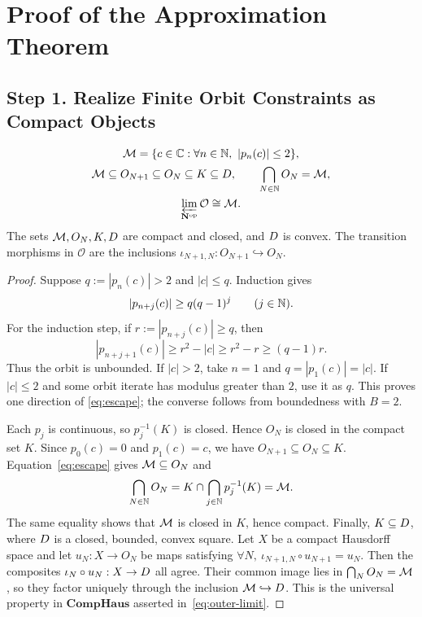 \section{Proof of the Approximation Theorem}
\label{sec:approximation-proof}

\subsection{Step 1. Realize Finite Orbit Constraints as Compact Objects}

\begin{lemma}
\label{lem:outer-sets}
\begin{gather}
 \mathcal M=\{c\in\mathbb C:\forall n\in\mathbb N,\ |p_n(c)|\le2\},\label{eq:escape}\\
 \mathcal M\subseteq O_{N+1}\subseteq O_N\subseteq K\subseteq D,\qquad
 \bigcap_{N\in\mathbb N}O_N=\mathcal M,\label{eq:outer-nesting}\\
 \varprojlim_{\mathbf N^{\mathrm{op}}}\mathcal O
       \cong\mathcal M.\label{eq:outer-limit}
\end{gather}
The sets \(\mathcal M,O_N,K,D\) are compact and closed, and \(D\) is convex.
The transition morphisms in \(\mathcal O\) are the inclusions
\(\iota_{N+1,N}:O_{N+1}\hookrightarrow O_N\).
\end{lemma}
\begin{proof}
Suppose \(q:=|p_n(c)|>2\) and \(|c|\le q\). Induction gives
\[
 |p_{n+j}(c)|\ge q(q-1)^j\qquad(j\in\mathbb N).
\]
For the induction step, if \(r:=|p_{n+j}(c)|\ge q\), then
\[
 |p_{n+j+1}(c)|
 \ge r^2-|c|
 \ge r^2-r
 \ge(q-1)r.
\]
Thus the orbit is unbounded. If \(|c|>2\), take \(n=1\) and
\(q=|p_1(c)|=|c|\). If \(|c|\le2\) and some orbit iterate has modulus
greater than \(2\), use it as \(q\). This proves one direction of
\eqref{eq:escape}; the converse follows from boundedness with \(B=2\).

Each \(p_j\) is continuous, so \(p_j^{-1}(K)\) is closed. Hence \(O_N\)
is closed in the compact set \(K\). Since \(p_0(c)=0\) and \(p_1(c)=c\),
we have \(O_{N+1}\subseteq O_N\subseteq K\). Equation~\eqref{eq:escape}
gives \(\mathcal M\subseteq O_N\) and
\[
 \bigcap_{N\in\mathbb N}O_N
 =K\cap\bigcap_{j\in\mathbb N}p_j^{-1}(K)=\mathcal M.
\]
The same equality shows that \(\mathcal M\) is closed in \(K\), hence compact.
Finally, \(K\subseteq D\), where \(D\) is a closed, bounded, convex
square. Let \(X\) be a compact Hausdorff space and let
\(u_N:X\to O_N\) be maps satisfying
\(\forall N,\ \iota_{N+1,N}\circ u_{N+1}=u_N\). Then the composites
\(\iota_N\circ u_N:X\to D\) all agree. Their common image lies in
\(\bigcap_NO_N=\mathcal M\), so they factor uniquely through the inclusion
\(\mathcal M\hookrightarrow D\). This is the universal property in
\(\mathbf{CompHaus}\) asserted in~\eqref{eq:outer-limit}.
\end{proof}

